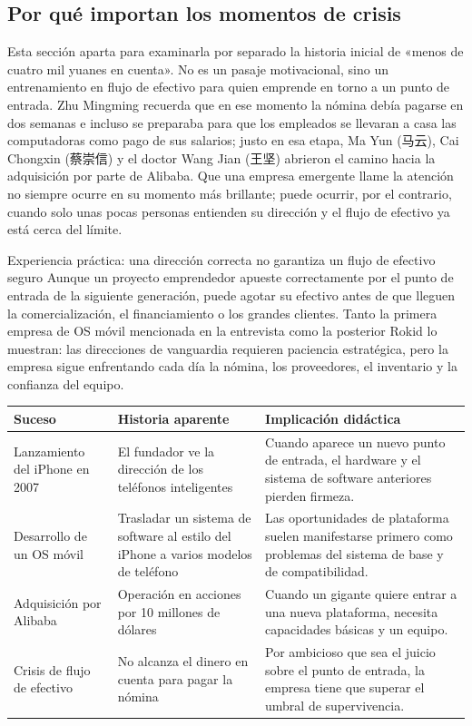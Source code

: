 \documentclass[a4paper]{article}
\begin{document}
\subsection{Por qué importan los momentos de crisis}

Esta sección aparta para examinarla por separado la historia inicial de «menos de cuatro mil yuanes en cuenta». No es un pasaje motivacional, sino un entrenamiento en flujo de efectivo para quien emprende en torno a un punto de entrada. Zhu Mingming recuerda que en ese momento la nómina debía pagarse en dos semanas e incluso se preparaba para que los empleados se llevaran a casa las computadoras como pago de sus salarios; justo en esa etapa, Ma Yun (马云), Cai Chongxin (蔡崇信) y el doctor Wang Jian (王坚) abrieron el camino hacia la adquisición por parte de Alibaba. Que una empresa emergente llame la atención no siempre ocurre en su momento más brillante; puede ocurrir, por el contrario, cuando solo unas pocas personas entienden su dirección y el flujo de efectivo ya está cerca del límite.

\begin{warningbox}{Experiencia práctica: una dirección correcta no garantiza un flujo de efectivo seguro}
Aunque un proyecto emprendedor apueste correctamente por el punto de entrada de la siguiente generación, puede agotar su efectivo antes de que lleguen la comercialización, el financiamiento o los grandes clientes. Tanto la primera empresa de OS móvil mencionada en la entrevista como la posterior Rokid lo muestran: las direcciones de vanguardia requieren paciencia estratégica, pero la empresa sigue enfrentando cada día la nómina, los proveedores, el inventario y la confianza del equipo.
\end{warningbox}

\noindent\begin{tabularx}{\textwidth}{p{}p{}X}
\toprule
Suceso & Historia aparente & Implicación didáctica \\
\midrule
Lanzamiento del iPhone en 2007 & El fundador ve la dirección de los teléfonos inteligentes & Cuando aparece un nuevo punto de entrada, el hardware y el sistema de software anteriores pierden firmeza. \\
Desarrollo de un OS móvil & Trasladar un sistema de software al estilo del iPhone a varios modelos de teléfono & Las oportunidades de plataforma suelen manifestarse primero como problemas del sistema de base y de compatibilidad. \\
Adquisición por Alibaba & Operación en acciones por 10 millones de dólares & Cuando un gigante quiere entrar a una nueva plataforma, necesita capacidades básicas y un equipo. \\
Crisis de flujo de efectivo & No alcanza el dinero en cuenta para pagar la nómina & Por ambicioso que sea el juicio sobre el punto de entrada, la empresa tiene que superar el umbral de supervivencia. \\
\bottomrule
\end{tabularx}
\end{document}
